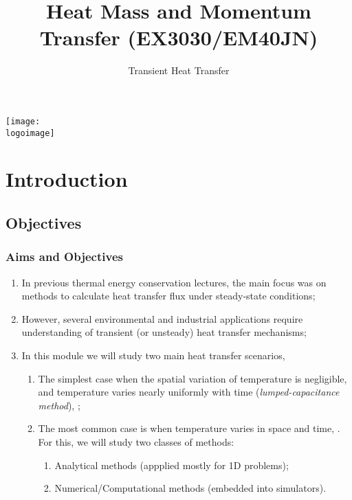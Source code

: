 \documentclass[10pt,compress,handout,unknownkeysallowed]{beamer}
\institute{School of Engineering}
\title{Heat Mass and Momentum Transfer (EX3030/EM40JN)}
\subtitle{Transient Heat Transfer}
\date[ ]{ }
\newcommand{\logoimage}{../FigBanner/UoAHorizBanner}
\begin{document}
\begin{frame}
  \titlepage
  \vfill%
  \begin{center}
    \texttt{[image: \\logoimage]}
  \end{center}
\end{frame}




\section{Introduction} 


\subsection{Objectives}

\begin{frame}
 \frametitle{Aims and Objectives}
   \begin{enumerate}
     \item<1-> In previous thermal energy conservation lectures, the main focus was on methods to calculate heat transfer flux under steady-state conditions;
     \item<1-> However, several environmental and industrial applications require understanding of transient (or unsteady) heat transfer mechanisms;
     \item<2-> In this module we will study two main heat transfer scenarios,
         \begin{enumerate}
            \item<2-> The simplest case when the spatial variation of temperature is negligible, and temperature varies nearly uniformly with time ({\it lumped-capacitance method}), \ie {};
            \item<3-> The most common case is when temperature varies in space and time, \ie {}. For this, we will study two classes of methods:
              \begin{enumerate}
                 \item<4-> Analytical methods (appplied mostly for 1D problems);
                 \item<5-> Numerical/Computational methods (embedded into simulators). 
              \end{enumerate}
         \end{enumerate}
   \end{enumerate}
\end{frame}
\end{document}

